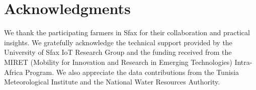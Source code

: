 \documentclass[a4paper,fleqn]{cas-dc}
\begin{document}
\section*{Acknowledgments}

We thank the participating farmers in Sfax for their collaboration and
practical insights. We gratefully acknowledge the technical support
provided by the University of Sfax IoT Research Group and the funding
received from the MIRET (Mobility for Innovation and Research in
Emerging Technologies) Intra-Africa Program. We also appreciate the data
contributions from the Tunisia Meteorological Institute and the National
Water Resources Authority.



\end{document}
